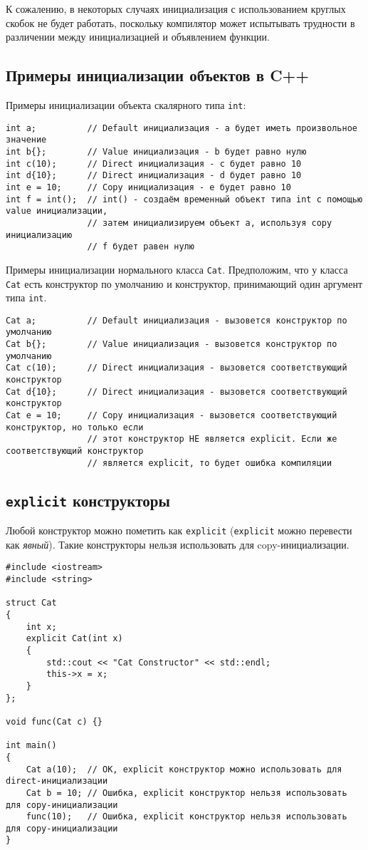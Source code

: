 \documentclass{article}
\begin{document}
К сожалению, в некоторых случаях инициализация с использованием круглых скобок не будет работать, поскольку компилятор может испытывать трудности в различении между инициализацией и объявлением функции.


\subsection*{Примеры инициализации объектов в C++}
Примеры инициализации объекта скалярного типа \texttt{int}:
\begin{lstlisting}
int a;          // Default инициализация - a будет иметь произвольное значение
int b{};        // Value инициализация - b будет равно нулю
int c(10);      // Direct инициализация - c будет равно 10
int d{10};      // Direct инициализация - d будет равно 10
int e = 10;     // Copy инициализация - e будет равно 10
int f = int();  // int() - создаём временный объект типа int с помощью value инициализации,
                // затем инициализируем объект a, используя copy инициализацию 
                // f будет равен нулю
\end{lstlisting}
Примеры инициализации нормального класса \texttt{Cat}. Предположим, что у класса \texttt{Cat} есть конструктор по умолчанию и конструктор, принимающий один аргумент типа \texttt{int}.
\begin{lstlisting}
Cat a;          // Default инициализация - вызовется конструктор по умолчанию
Cat b{};        // Value инициализация - вызовется конструктор по умолчанию
Cat c(10);      // Direct инициализация - вызовется соответствующий конструктор
Cat d{10};      // Direct инициализация - вызовется соответствующий конструктор
Cat e = 10;     // Copy инициализация - вызовется соответствующий конструктор, но только если
                // этот конструктор НЕ является explicit. Если же соответствующий конструктор 
                // является explicit, то будет ошибка компиляции
\end{lstlisting}

\newpage


\subsection*{\texttt{explicit} конструкторы}
Любой конструктор можно пометить как \texttt{explicit} (\texttt{explicit} можно перевести как \textit{явный}). Такие конструкторы нельзя использовать для copy-инициализации. 
\begin{lstlisting}
#include <iostream>
#include <string>

struct Cat
{
	int x;
	explicit Cat(int x) 
	{
		std::cout << "Cat Constructor" << std::endl;
		this->x = x;
	}
};

void func(Cat c) {}

int main()
{
	Cat a(10);  // OK, explicit конструктор можно использовать для direct-инициализации
	Cat b = 10; // Ошибка, explicit конструктор нельзя использовать для copy-инициализации
	func(10);   // Ошибка, explicit конструктор нельзя использовать для copy-инициализации
}
\end{lstlisting}
\end{document}
